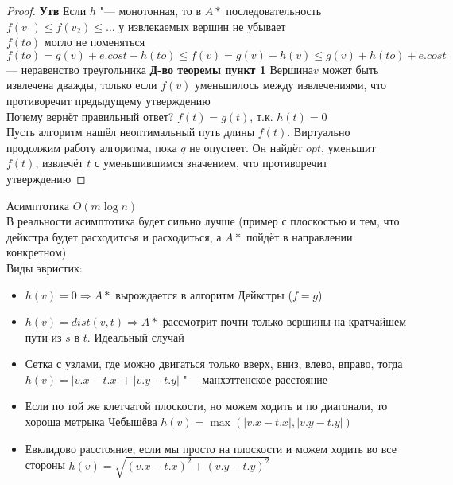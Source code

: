 \documentclass[a4paper, 12pt]{article}
\theoremstyle{plain}
\theoremstyle{definition}
\theoremstyle{remark}
\begin{document}
\begin{proof}
	\textbf{Утв} Если $h$ "--- монотонная, то в $A*$ последовательность $f(v_1)\leq f(v_2)\leq\dots$ у извлекаемых вершин не убывает\\
	$f(to)$ могло не поменяться\\
	$f(to)=g(v)+e.cost+h(to)\leq f(v) = g(v) + h(v)\leq g(v) + h(to) + e.cost$ --- неравенство треугольника
	\newpage
	\textbf{Д-во теоремы пункт 1}  Вершина$v$ может быть извлечена дважды, только если $f(v)$ уменьшилось между извлечениями, что противоречит предыдущему утверждению\\
	Почему вернёт правильный ответ? $f(t)=g(t)$, т.к. $h(t)=0$\\
	Пусть алгоритм нашёл неоптимальный путь длины $f(t)$. Виртуально продолжим работу алгоритма, пока  $q$ не опустеет. Он найдёт $opt$, уменьшит $f(t)$, извлечёт $t$ с уменьшившимся значением, что противоречит утверждению
\end{proof}
Асимптотика $O(m\log n)$\\
В реальности асимптотика будет сильно лучше (пример с плоскостью и тем, что дейкстра будет расходитсья и расходиться, а $A*$ пойдёт в направлении конкретном)\\
Виды эвристик:
\begin{itemize}
	\item $h(v)=0\Rightarrow A*$ вырождается в алгоритм Дейкстры ($f=g$)
	\item $h(v)=dist(v,t)\Rightarrow A*$ рассмотрит почти только вершины на кратчайшем пути из $s$ в $t$. Идеальный случай
	\item Сетка с узлами, где можно двигаться только вверх, вниз, влево, вправо, тогда $h(v)=|v.x-t.x|+|v.y-t.y|$ "--- манхэттенское расстояние
	\item Если по той же клетчатой плоскости, но можем ходить и по диагонали, то хороша метрыка Чебышёва $h(v)=\max(|v.x-t.x|, |v.y-t.y|)$
	\item Евклидово расстояние, если мы просто на плоскости и можем ходить во все стороны $h(v)=\sqrt{(v.x-t.x)^2+(v.y-t.y)^2}$
\end{itemize}
\end{document}
